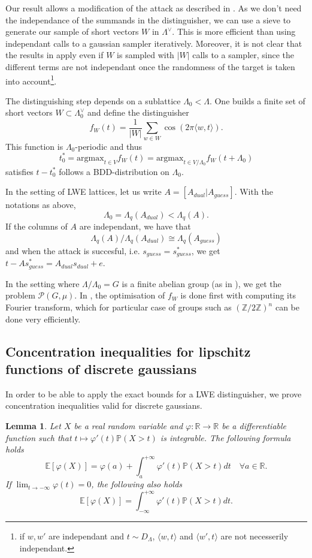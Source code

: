 \documentclass{article}
\newtheorem{lemma}{Lemma}
\begin{document}
Our result allows a modification of the attack as described in \cite{pouly2023provable}. As we don't need the independance of the summands in the distinguisher, we can use a sieve to generate our sample of short vectors $W$ in $\Lambda^\vee$. This is more efficient than using independant calls to a gaussian sampler iteratively. Moreover, it is not clear that the results in \cite{pouly2023provable} apply even if $W$ is sampled with $|W|$ calls to a sampler, since the different terms are not independant once the randomness of the target is taken into account\footnote{if $w,w'$ are independant and $t\sim D_\Lambda$, $\langle w , t \rangle $ and $\langle w' , t \rangle $ are not necesserily independant.}.   
 
The distinguishing step depends on a sublattice $\Lambda_0 < \Lambda$. One builds a finite set of short vectors $W\subset \Lambda_0^\vee$ and define the distinguisher
$$f_W(t) = \frac{1}{|W|} \sum_{w\in W} \cos (2\pi \langle w, t\rangle ).$$ 
This function is $\Lambda_0$-periodic and thus 
$$ t_0^* = \text{argmax}_{t\in V} f_W(t) = \text{argmax}_{t\in V/\Lambda_0} f_W(t+ \Lambda_0) $$
satisfies $t - t_0^*$ follows a BDD-distribution on $\Lambda_0$.

In the setting of LWE lattices, let us write $A  = [A_{dual} | A_{guess} ]$. With the notations as above, 
$$\Lambda_0 = \Lambda_{q}(A_{dual}) < \Lambda_q(A).$$ 
If the columns of $A$ are independant, we have that 
$$\Lambda_{q}(A) / \Lambda_{q}(A_{dual}) \cong \Lambda_{q}(A_{guess})$$ 
and when the attack is succesful, i.e. $s_{guess} = s_{guess}^*$, we get $t-As_{guess}^* = A_{dual}s_{dual} + e$.

In the setting where $\Lambda / \Lambda_0 = G$ is a finite abelian group (as in \cite{ducas2023does}), we get the problem $\mathcal P(G,\mu)$. In \cite{ducas2023does}, the optimisation of $f_W$ is done first with computing its Fourier transform, which for particular case of groups such as $(\mathbb Z / 2 \mathbb Z)^n$ can be done very efficiently. 

\subsection{Concentration inequalities for lipschitz functions of discrete gaussians}
In order to be able to apply the exact bounds for a LWE distinguisher, we prove concentration inequalities valid for discrete gaussians. 

\begin{lemma}
Let $X$ be a real random variable and $\varphi : \mathbb R \rightarrow \mathbb R$ be a differentiable function such that $t\mapsto \varphi'(t)\mathbb P(X>t)$ is integrable. The following formula holds
$$\mathbb E [\varphi(X)] = \varphi(a) + \int_{a}^{+\infty} \varphi'(t)\mathbb P(X > t) dt \quad \forall a \in \mathbb R.$$
If $\lim_{t\rightarrow -\infty}\varphi(t) =0$, the following also holds
$$\mathbb E [\varphi(X)] = \int_{-\infty}^{+\infty} \varphi'(t)\mathbb P(X > t) dt.$$
\end{lemma}
\end{document}
